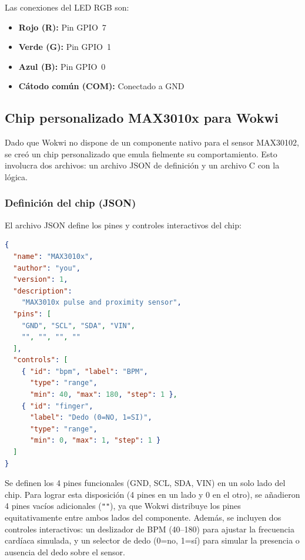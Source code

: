 \documentclass[11pt,a4paper]{article}
\begin{document}
Las conexiones del LED RGB son:
\begin{itemize}
    \item \textbf{Rojo (R):} Pin GPIO~7
    \item \textbf{Verde (G):} Pin GPIO~1
    \item \textbf{Azul (B):} Pin GPIO~0
    \item \textbf{Cátodo común (COM):} Conectado a GND
\end{itemize}

\subsection{Chip personalizado MAX3010x para Wokwi}

Dado que Wokwi no dispone de un componente nativo para el sensor MAX30102, se creó un chip personalizado que emula fielmente su comportamiento. Esto involucra dos archivos: un archivo JSON de definición y un archivo C con la lógica.

\subsubsection{Definición del chip (JSON)}

El archivo JSON define los pines y controles interactivos del chip:

\begin{lstlisting}[language=JSON, caption={max3010x.chip.json}, label={lst:chip-json}]
{
  "name": "MAX3010x",
  "author": "you",
  "version": 1,
  "description":
    "MAX3010x pulse and proximity sensor",
  "pins": [
    "GND", "SCL", "SDA", "VIN",
    "", "", "", ""
  ],
  "controls": [
    { "id": "bpm", "label": "BPM",
      "type": "range",
      "min": 40, "max": 180, "step": 1 },
    { "id": "finger",
      "label": "Dedo (0=NO, 1=SI)",
      "type": "range",
      "min": 0, "max": 1, "step": 1 }
  ]
}
\end{lstlisting}

Se definen los 4 pines funcionales (GND, SCL, SDA, VIN) en un solo lado del chip. Para lograr esta disposición (4 pines en un lado y 0 en el otro), se añadieron 4 pines vacíos adicionales (\texttt{""}), ya que Wokwi distribuye los pines equitativamente entre ambos lados del componente. Además, se incluyen dos controles interactivos: un deslizador de BPM (40--180) para ajustar la frecuencia cardíaca simulada, y un selector de dedo (0=no, 1=sí) para simular la presencia o ausencia del dedo sobre el sensor.
\end{document}
